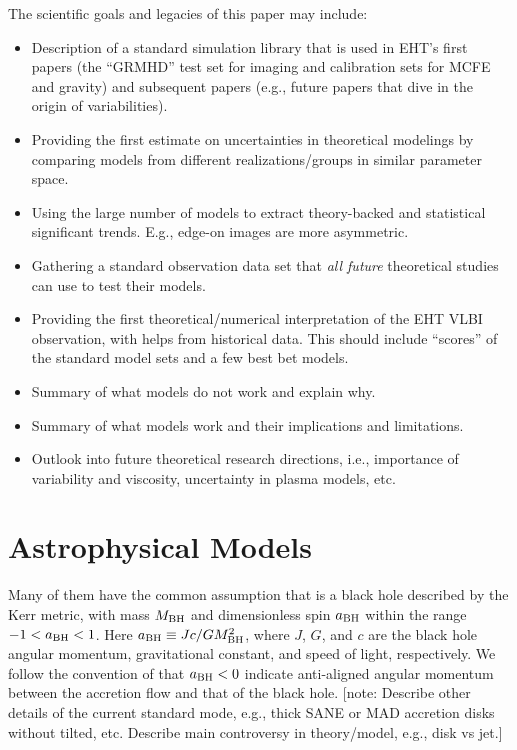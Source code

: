 \documentclass[twocolumn,twocolappendix,tighten,dvipsnames,linenumbers]{aastex63}
\newcommand\note[1]{{\color{OliveGreen}[note: #1]}}
\begin{document}
The scientific goals and legacies of this paper may include:
\begin{itemize}
\item Description of a standard simulation library that is used in EHT's
  first \sgra papers (the ``GRMHD'' test set for imaging and calibration sets for
  MCFE and gravity) and subsequent papers (e.g., future papers that dive in the origin of
  variabilities).
\item Providing the first estimate on uncertainties in theoretical
  modelings by comparing models from different realizations/groups in
  similar parameter space.
\item Using the large number of models to extract theory-backed and
  statistical significant trends.
  E.g., edge-on images are more asymmetric.
\item Gathering a standard observation data set that \emph{all future}
  theoretical studies can use to test their models.
\item Providing the first theoretical/numerical interpretation of the
  EHT \sgra VLBI observation, with helps from historical data.
  This should include ``scores'' of the standard model sets and a few
  best bet models.
\item Summary of what models do not work and explain why.
\item Summary of what models work and their implications and
  limitations.
\item Outlook into future theoretical research directions, i.e.,
  importance of variability and viscosity, uncertainty in plasma
  models, etc.
\end{itemize}

\clearpage

\section{Astrophysical Models}

Many of them have the common assumption that \sgra is a black hole
described by the Kerr metric, with mass $M_{\rm BH}$ and dimensionless spin
${a_{\rm BH}}$ within the range $-1 < {a_{\rm BH}} < 1$.
Here ${a_{\rm BH}} \equiv Jc/GM_{\rm BH}^2$, where $J$, $G$, and $c$ are the black
hole angular momentum, gravitational constant, and speed of light,
respectively.
We follow the convention of  that
${a_{\rm BH}} < 0$ indicate anti-aligned angular momentum between the
accretion flow and that of the black hole.
\note{Describe other details of the current standard \sgra mode, e.g.,
  thick SANE or MAD accretion disks without tilted, etc.
  Describe main controversy in theory/model, e.g., disk vs jet.}
\end{document}
